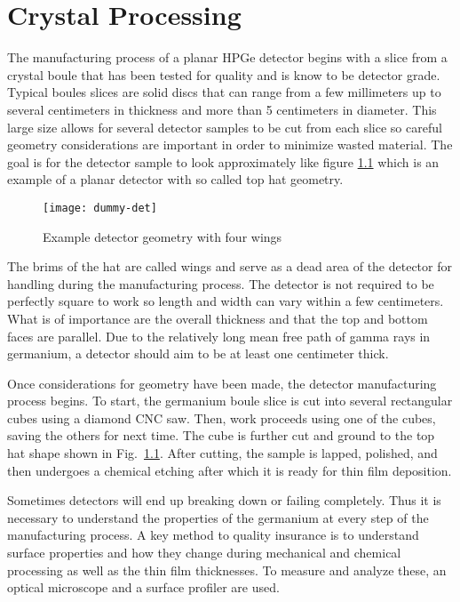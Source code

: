 \chapter{Crystal Processing}
The manufacturing process of a planar HPGe detector begins with a slice from a crystal boule that has been tested for quality and is know to be detector grade.
Typical boules slices are solid discs that can range from a few millimeters up to several centimeters in thickness and more than 5 centimeters in diameter.
This large size allows for several detector samples to be cut from each slice so careful geometry considerations are important in order to minimize wasted material.
The goal is for the detector sample to look approximately like figure \ref{fig:dummydet} which is an example of a planar detector with so called top hat geometry.
\begin{figure}[htpb]
\centering
\texttt{[image: dummy-det]}
\caption{Example detector geometry with four wings}
\label{fig:dummydet}
\end{figure}
The brims of the hat are called wings and serve as a dead area of the detector for handling during the manufacturing process.
The detector is not required to be perfectly square to work so length and width can vary within a few centimeters.
What is of importance are the overall thickness and that the top and bottom faces are parallel.
Due to the relatively long mean free path of gamma rays in germanium, a detector should aim to be at least one centimeter thick.

Once considerations for geometry have been made, the detector manufacturing process begins.
To start, the germanium boule slice is cut into several rectangular cubes using a diamond CNC saw.
Then, work proceeds using one of the cubes, saving the others for next time.
The cube is further cut and ground to the top hat shape shown in Fig.~\ref{fig:dummydet}.
After cutting, the sample is lapped, polished, and then undergoes a chemical etching after which it is ready for thin film deposition.

Sometimes detectors will end up breaking down or failing completely.
Thus it is necessary to understand the properties of the germanium at every step of the manufacturing process.
A key method to quality insurance is to understand surface properties and how they change during mechanical and chemical processing as well as the thin film thicknesses.
To measure and analyze these, an optical microscope and a surface profiler are used.

